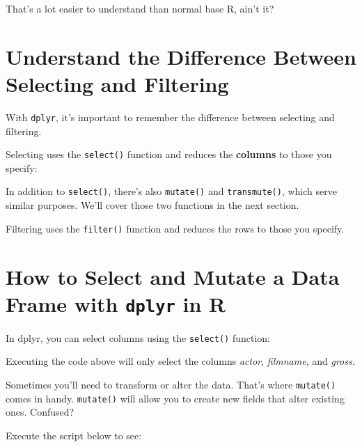 \documentclass[
]{book}
\newenvironment{Shaded}{\begin{snugshade}}{\end{snugshade}}
\newcommand{\DataTypeTok}[1]{\textcolor[rgb]{0.13,0.29,0.53}{#1}}
\newcommand{\DecValTok}[1]{\textcolor[rgb]{0.00,0.00,0.81}{#1}}
\newcommand{\KeywordTok}[1]{\textcolor[rgb]{0.13,0.29,0.53}{\textbf{#1}}}
\newcommand{\NormalTok}[1]{#1}
\newcommand{\OperatorTok}[1]{\textcolor[rgb]{0.81,0.36,0.00}{\textbf{#1}}}
\newcommand{\StringTok}[1]{\textcolor[rgb]{0.31,0.60,0.02}{#1}}
\begin{document}
\begin{center}
That's a lot easier to understand than normal base R, ain't it?

\hypertarget{understand-the-difference-between-selecting-and-filtering}{%
\section{Understand the Difference Between Selecting and Filtering}\label{understand-the-difference-between-selecting-and-filtering}}

With \texttt{dplyr}, it's important to remember the difference between selecting and filtering.

Selecting uses the \texttt{select()} function and reduces the \textbf{columns} to those you specify:

In addition to \texttt{select()}, there's also \texttt{mutate()} and \texttt{transmute()}, which serve similar purposes. We'll cover those two functions in the next section.

Filtering uses the \texttt{filter()} function and reduces the rows to those you specify.

\hypertarget{how-to-select-and-mutate-a-data-frame-with-dplyr-in-r}{%
\section{\texorpdfstring{How to Select and Mutate a Data Frame with \texttt{dplyr} in R}{How to Select and Mutate a Data Frame with dplyr in R}}\label{how-to-select-and-mutate-a-data-frame-with-dplyr-in-r}}

In dplyr, you can select columns using the \texttt{select()} function:

\begin{Shaded}
\end{Shaded}

Executing the code above will only select the columns \emph{actor}, \emph{filmname}, and \emph{gross.}

Sometimes you'll need to transform or alter the data. That's where \texttt{mutate()} comes in handy. \texttt{mutate()} will allow you to create new fields that alter existing ones. Confused?

Execute the script below to see:

\begin{Shaded}
\end{Shaded}


\end{center}
\end{document}
